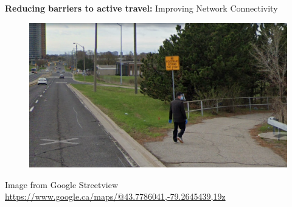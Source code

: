 \documentclass[aspectratio=169]{beamer}
\begin{document}
\begin{frame}
	
	\textbf{Reducing barriers to active travel:} Improving Network Connectivity
	
	\begin{figure}
		\centering
		\includegraphics[width=1\linewidth]{images/brimley.png}
	\end{figure}
	
	\tiny Image from Google Streetview 
	\url{https://www.google.ca/maps/@43.7786041,-79.2645439,19z}
	
\end{frame}
\end{document}
